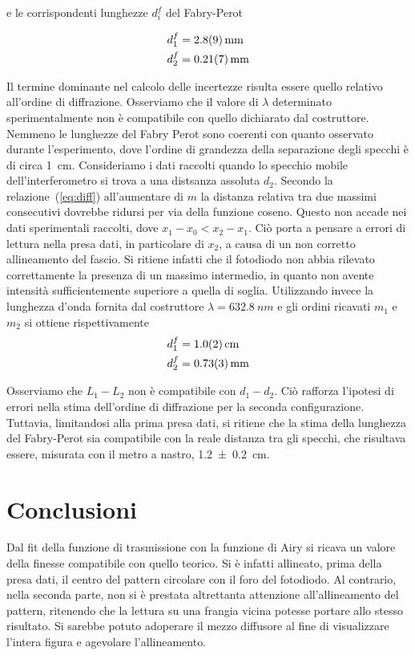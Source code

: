 \documentclass[10pt,oneside,a4paper]{article}
\begin{document}
\begin{multicols}{2}
e le corrispondenti lunghezze $d_i^f$ del Fabry-Perot

\[
\begin{aligned}
d_1^f &= \SI{2.8 \pm 0.9}{mm} \\
d_2^f &= \SI{0.21 \pm 0.07}{mm}
\end{aligned}
\]

Il termine dominante nel calcolo delle incertezze risulta essere quello relativo all'ordine di diffrazione. Osserviamo che il valore di $\lambda$ determinato sperimentalmente non è compatibile con quello dichiarato dal costruttore. Nemmeno le lunghezze del Fabry Perot sono coerenti con quanto osservato durante l'esperimento, dove l'ordine di grandezza della separazione degli specchi è di circa \SI{1}{cm}. Consideriamo i dati raccolti quando lo specchio mobile dell'interferometro si trova a una distsanza assoluta $d_2$. Secondo la relazione~(\ref{eq:diff}) all'aumentare di $m$ la distanza relativa tra due massimi consecutivi dovrebbe ridursi per via della funzione coseno. Questo non accade nei dati sperimentali raccolti, dove $x_1-x_0 < x_2-x_1$. Ciò porta a pensare a errori di lettura nella presa dati, in particolare di $x_2$, a causa di un non corretto allineamento del fascio. Si ritiene infatti che il fotodiodo non abbia rilevato correttamente la presenza di un massimo intermedio, in quanto non avente intensità sufficientemente superiore a quella di soglia.
Utilizzando invece la lunghezza d'onda fornita dal costruttore $\lambda = \SI{632.8}{nm}$ e gli ordini ricavati $m_1$ e $m_2$ si ottiene rispettivamente
\[
\begin{aligned}
d_1^f &= \SI{1 \pm 0.2}{cm} \\
d_2^f &= \SI{0.73 \pm 0.03}{mm}
\end{aligned}
\]

Osserviamo che $L_1-L_2$ non è compatibile con $d_1 - d_2$. Ciò rafforza l'ipotesi di errori nella stima dell'ordine di diffrazione per la seconda configurazione. Tuttavia, limitandosi alla prima presa dati, si ritiene che la stima della lunghezza del Fabry-Perot sia compatibile con la reale distanza tra gli specchi, che risultava essere, misurata con il metro a nastro, \SI{1.2 \pm 0.2}{cm}.



\section{Conclusioni}
Dal fit della funzione di trasmissione con la funzione di Airy si ricava un valore della finesse compatibile con quello teorico. Si è infatti allineato, prima della presa dati, il centro del pattern circolare con il foro del fotodiodo. Al contrario, nella seconda parte, non si è prestata altrettanta attenzione all'allineamento del pattern, ritenendo che la lettura su una frangia vicina potesse portare allo stesso risultato. Si sarebbe potuto adoperare il mezzo diffusore al fine di visualizzare l'intera figura e agevolare l'allineamento.


\end{multicols}
\end{document}
